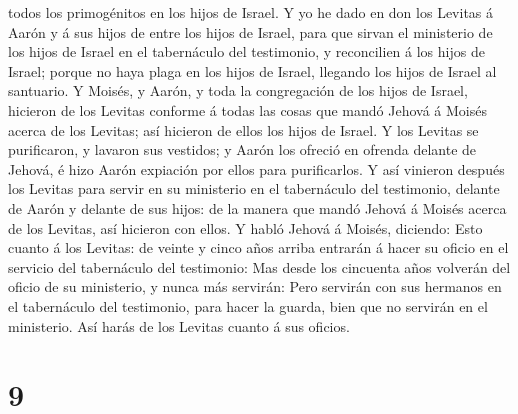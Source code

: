 todos los primogénitos en los hijos de Israel.  Y yo he
dado en don los Levitas á Aarón y á sus hijos de entre los hijos de
Israel, para que sirvan el ministerio de los hijos de Israel en el
tabernáculo del testimonio, y reconcilien á los hijos de Israel; porque
no haya plaga en los hijos de Israel, llegando los hijos de Israel al
santuario.  Y Moisés, y Aarón, y toda la congregación de
los hijos de Israel, hicieron de los Levitas conforme á todas las cosas
que mandó Jehová á Moisés acerca de los Levitas; así hicieron de ellos
los hijos de Israel.  Y los Levitas se purificaron, y
lavaron sus vestidos; y Aarón los ofreció en ofrenda delante de Jehová,
é hizo Aarón expiación por ellos para purificarlos.  Y
así vinieron después los Levitas para servir en su ministerio en el
tabernáculo del testimonio, delante de Aarón y delante de sus hijos: de
la manera que mandó Jehová á Moisés acerca de los Levitas, así hicieron
con ellos.  Y habló Jehová á Moisés, diciendo:
 Esto cuanto á los Levitas: de veinte y cinco años arriba
entrarán á hacer su oficio en el servicio del tabernáculo del
testimonio:  Mas desde los cincuenta años volverán del
oficio de su ministerio, y nunca más servirán:  Pero
servirán con sus hermanos en el tabernáculo del testimonio, para hacer
la guarda, bien que no servirán en el ministerio. Así harás de los
Levitas cuanto á sus oficios.

\hypertarget{section-8}{%
\section{9}\label{section-8}}


